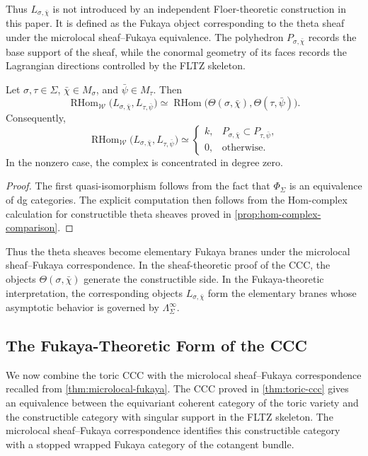Thus \(L_{\sigma,\bar\chi}\) is not introduced by an independent Floer-theoretic
construction in this paper. It is defined as the Fukaya object corresponding
to the theta sheaf under the microlocal sheaf--Fukaya equivalence. The
polyhedron \(P_{\sigma,\bar\chi}\) records the base support of the sheaf,
while the conormal geometry of its faces records the Lagrangian directions
controlled by the FLTZ skeleton.

\begin{proposition}
Let \(\sigma,\tau\in\Sigma\), \(\bar\chi\in M_\sigma\), and
\(\bar\psi\in M_\tau\). Then
\[
\operatorname{RHom}_{\mathcal W}
\bigl(L_{\sigma,\bar\chi},L_{\tau,\bar\psi}\bigr)
\simeq
\operatorname{RHom}
\bigl(\Theta(\sigma,\bar\chi),\Theta(\tau,\bar\psi)\bigr).
\]
Consequently,
\[
\operatorname{RHom}_{\mathcal W}
\bigl(L_{\sigma,\bar\chi},L_{\tau,\bar\psi}\bigr)
\simeq
\begin{cases}
k, & P_{\sigma,\bar\chi}\subset P_{\tau,\bar\psi},\\
0, & \text{otherwise}.
\end{cases}
\]
In the nonzero case, the complex is concentrated in degree zero.
\end{proposition}

\begin{proof}
The first quasi-isomorphism follows from the fact that
\(\Phi_\Sigma\) is an equivalence of dg categories. The explicit computation
then follows from the Hom-complex calculation for constructible theta
sheaves proved in \cref{prop:hom-complex-comparison}.
\end{proof}

Thus the theta sheaves become elementary Fukaya branes under the microlocal
sheaf--Fukaya correspondence. In the sheaf-theoretic proof of the CCC, the
objects \(\Theta(\sigma,\bar\chi)\) generate the constructible side. In the
Fukaya-theoretic interpretation, the corresponding objects
\(L_{\sigma,\bar\chi}\) form the elementary branes whose asymptotic behavior
is governed by \(\Lambda_\Sigma^\infty\).
\subsection{The Fukaya-Theoretic Form of the CCC}
We now combine the toric CCC with the microlocal sheaf--Fukaya
correspondence recalled from \cref{thm:microlocal-fukaya}. The CCC proved in \cref{thm:toric-ccc} gives an
equivalence between the equivariant coherent category of the toric variety
and the constructible category with singular support in the FLTZ skeleton.
The microlocal sheaf--Fukaya correspondence identifies this constructible
category with a stopped wrapped Fukaya category of the cotangent bundle.

